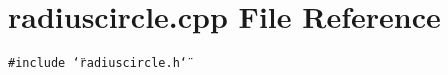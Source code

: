 \section{radiuscircle.cpp File Reference}
\label{radiuscircle_8cpp}
{\tt \#include \char`\"{}radiuscircle.h\char`\"{}}\par
